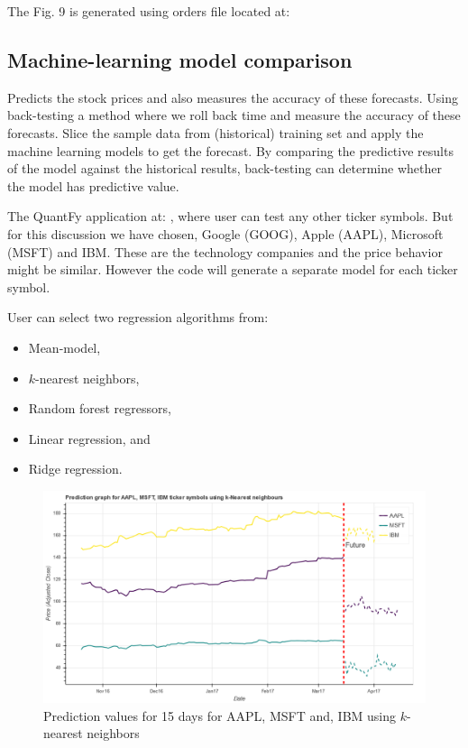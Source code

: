 \documentclass[12pt]{article}
\begin{document}
\begin{itemize}
The Fig. 9 is generated using orders file located at:
\\
\href{https://github.com/beegeesquare/QuantFy/blob/master/orders/orders_demo.csv}{\color{blue}{https://github.com/beegeesquare/QuantFy/blob/master/orders/orders\_demo.csv}}



\subsection{Machine-learning model comparison}
\label{sec:mlmodels}

Predicts the stock prices and also measures the accuracy of these forecasts. Using back-testing a method where we roll back time and measure the accuracy of these forecasts.  Slice the sample data from (historical) training set and apply the machine learning models to get the forecast.  By comparing the predictive results of the model against the historical results,  back-testing can determine whether the model has predictive value. 

The QuantFy application at: \href{http://quantfy.herokuapp.com/mlModels}{\color{blue}{http://quantfy.herokuapp.com/mlModels}}, where user can test any other ticker symbols. But for this discussion we have chosen, Google (GOOG), Apple (AAPL), Microsoft (MSFT) and IBM. These are the technology companies and the price behavior might be similar. However the code will generate a separate model for each ticker symbol.

User can select two regression algorithms from:

\begin{itemize}
\item Mean-model,
\item $k$-nearest neighbors,
\item Random forest regressors,
\item Linear regression, and
\item Ridge regression.
\end{itemize}

\begin{figure}[!htbp]

\begin{center}
\includegraphics[height=0.4\textheight,width=\textwidth]{knn_model.png}
\caption{Prediction values for 15 days for AAPL, MSFT and, IBM using $k$-nearest neighbors }
\label{fig:knn_mdl}
\end{center}
\end{figure}


\end{itemize}
\end{document}
